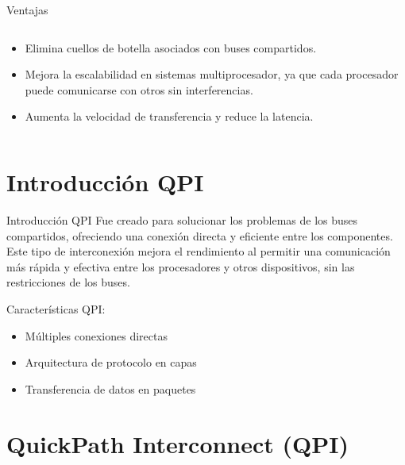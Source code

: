 \documentclass[presentation]{beamer}
\begin{document}
\begin{frame}[label={sec:org2fdf55a}]{Ventajas}
\begin{columns}
\begin{column}{0.8\columnwidth}
\begin{itemize}
\item Elimina cuellos de botella asociados con buses compartidos.
\item Mejora la escalabilidad en sistemas multiprocesador, ya que cada procesador puede comunicarse con otros sin interferencias.
\item Aumenta la velocidad de transferencia y reduce la latencia.
\end{itemize}
\end{column}
\end{columns}
\end{frame}
\section{Introducción QPI}
\label{sec:org952d437}
\begin{frame}[label={sec:org626b543}]{Introducción QPI}
Fue creado para solucionar los problemas de los buses compartidos, ofreciendo una conexión directa
y eficiente entre los componentes. Este tipo de interconexión mejora el rendimiento al permitir
una comunicación más rápida y efectiva entre los procesadores y otros dispositivos, sin las
restricciones de los buses. 
\par
\end{frame}
\begin{frame}[label={sec:orgbce7359}]{Características QPI:}
\begin{itemize}
\item Múltiples conexiones directas
\item Arquitectura de protocolo en capas
\item Transferencia de datos en paquetes
\end{itemize}
\end{frame}

\section{QuickPath Interconnect (QPI)}
\label{sec:org5d9216e}
\end{document}
